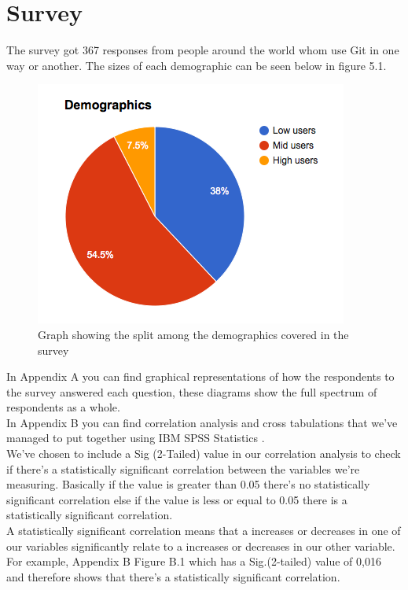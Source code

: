 \documentclass[a4paper,oneside]{bth} %
\begin{document}
			\section{Survey}
			The survey got 367 responses from people around the world whom use Git in one way or another. The sizes of each demographic can be seen below in figure 5.1.
			\begin{figure}[H]
				\centering
				\includegraphics[width=0.5\linewidth]{graphs/demo_split.png}
				\caption{Graph showing the split among the demographics covered in the survey}
				\label{fig:graph-demo-split}
			\end{figure}
			In Appendix A you can find graphical representations of how the respondents to the survey answered each question, these diagrams show the full spectrum of respondents as a whole.\\
			In Appendix B you can find correlation analysis and cross tabulations that we've managed to put together using IBM SPSS Statistics \cite{SPSS}.\\
			We've chosen to include a Sig (2-Tailed) value in our correlation analysis to check if there's a statistically significant correlation between the variables we're measuring. Basically if the value is greater than 0.05 there's no statistically significant correlation else if the value is less or equal to 0.05 there is a statistically significant correlation.\\
			A statistically significant correlation means that a increases or decreases in one of our variables significantly relate to a increases or decreases in our other variable.
			For example, Appendix B Figure B.1 which has a Sig.(2-tailed) value of 0,016 and therefore shows that there's a statistically significant correlation.\\\\
			
\end{document}
